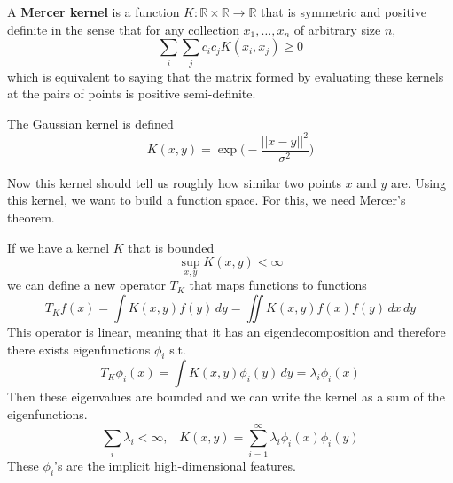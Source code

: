 \documentclass{article}
\begin{document}
    \begin{definition}
      A \textbf{Mercer kernel} is a function $K: \mathbb{R} \times \mathbb{R} \rightarrow \mathbb{R}$ that is symmetric and positive definite in the sense that for any collection $x_1, \ldots, x_n$ of arbitrary size $n$, 
      \begin{equation}
        \sum_i \sum_j c_i c_j K(x_i, x_j) \geq 0 
      \end{equation}
      which is equivalent to saying that the matrix formed by evaluating these kernels at the pairs of points is positive semi-definite. 
    \end{definition}

    \begin{example}
      The Gaussian kernel is defined 
      \begin{equation}
        K(x, y) = \exp \bigg( - \frac{||x - y||^2}{\sigma^2} \bigg)
      \end{equation}
    \end{example} 

    Now this kernel should tell us roughly how similar two points $x$ and $y$ are. Using this kernel, we want to build a function space. For this, we need Mercer's theorem. 

    \begin{theorem}
      If we have a kernel $K$ that is bounded 
      \begin{equation}
        \sup_{x, y} K(x, y) < \infty
      \end{equation}
      we can define a new operator $T_K$ that maps functions to functions
      \begin{equation}
        T_K f(x) =  \int K(x, y) f(y) \,dy = \iint K(x, y) f(x) f(y) \,dx\,dy
      \end{equation}
      This operator is linear, meaning that it has an eigendecomposition and therefore there exists eigenfunctions $\phi_i$ s.t. 
      \begin{equation}
        T_K \phi_i (x) = \int K(x, y) \phi_i(y) \,dy = \lambda_i \phi_i(x)
      \end{equation}
      Then these eigenvalues are bounded and we can write the kernel as a sum of the eigenfunctions. 
      \begin{equation}
        \sum_i \lambda_i < \infty, \;\;\; K(x, y) = \sum_{i=1}^\infty \lambda_i \phi_i(x) \phi_i(y)
      \end{equation}
      These $\phi_i$'s are the implicit high-dimensional features. 
    \end{theorem}
\end{document}
